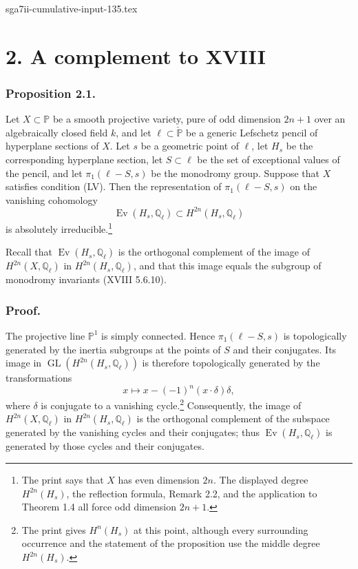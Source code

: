 \begin{filecontents*}{sga7ii-cumulative-input-135.tex}
\section*{2. A complement to XVIII}

\subsubsection*{Proposition 2.1.}
Let $X\subset\mathbb P$ be a smooth projective variety, pure of odd
dimension $2n+1$ over an algebraically closed field $k$, and let
$\ell\subset\check{\mathbb P}$ be a generic Lefschetz pencil of hyperplane
sections of $X$.  Let $s$ be a geometric point of $\ell$, let $H_s$ be the
corresponding hyperplane section, let $S\subset\ell$ be the set of exceptional
values of the pencil, and let $\pi_1(\ell-S,s)$ be the monodromy group.
Suppose that $X$ satisfies condition (LV).  Then the representation of
$\pi_1(\ell-S,s)$ on the vanishing cohomology
\[
\operatorname{Ev}(H_s,\mathbb Q_\ell)
\subset H^{2n}(H_s,\mathbb Q_\ell)
\]
is absolutely irreducible.\footnote{The print says that $X$ has even
dimension $2n$.  The displayed degree $H^{2n}(H_s)$, the reflection formula,
Remark 2.2, and the application to Theorem 1.4 all force odd dimension
$2n+1$.}

Recall that $\operatorname{Ev}(H_s,\mathbb Q_\ell)$ is the orthogonal
complement of the image of $H^{2n}(X,\mathbb Q_\ell)$ in
$H^{2n}(H_s,\mathbb Q_\ell)$, and that this image equals the subgroup of
monodromy invariants (XVIII 5.6.10).

\subsubsection*{Proof.}
The projective line $\mathbb P^1$ is simply connected.  Hence
$\pi_1(\ell-S,s)$ is topologically generated by the inertia subgroups at the
points of $S$ and their conjugates.  Its image in
$\operatorname{GL}(H^{2n}(H_s,\mathbb Q_\ell))$ is therefore topologically
generated by the transformations
\[
x\longmapsto x-(-1)^n(x\cdot\delta)\delta,
\]
where $\delta$ is conjugate to a vanishing cycle.\footnote{The print gives
$H^n(H_s)$ at this point, although every surrounding occurrence and the
statement of the proposition use the middle degree $H^{2n}(H_s)$.}
Consequently, the image of $H^{2n}(X,\mathbb Q_\ell)$ in
$H^{2n}(H_s,\mathbb Q_\ell)$ is the orthogonal complement of the subspace
generated by the vanishing cycles and their conjugates; thus
$\operatorname{Ev}(H_s,\mathbb Q_\ell)$ is generated by those cycles and
their conjugates.


\end{filecontents*}
